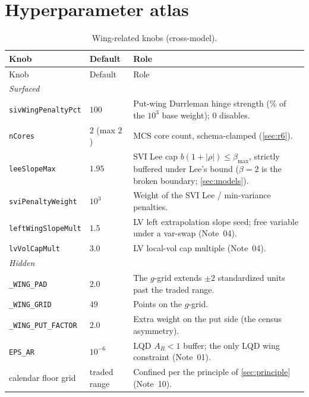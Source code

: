 \documentclass[11pt]{article}
\begin{document}
\appendix
\section{Hyperparameter atlas}
\label{app:atlas}

\begin{longtable}{p{}p{}p{}}
\caption{Wing-related knobs (cross-model).}\label{tab:atlas}\\
\toprule Knob & Default & Role\\ \midrule
\endfirsthead \toprule Knob & Default & Role\\ \midrule \endhead
\multicolumn{3}{l}{\emph{Surfaced}}\\ \midrule
\texttt{sivWingPenaltyPct} & $100$ & Put-wing Durrleman hinge strength
(\% of the $10^3$ base weight); $0$ disables.\\
\texttt{nCores} & $2$ (max $2$) & MCS core count, schema-clamped
(\cref{sec:r6}).\\
\texttt{leeSlopeMax} & $1.95$ & SVI Lee cap $b(1+|\rho|)\le\beta_{\max}$,
strictly buffered under Lee's bound ($\beta=2$ is the broken boundary;
\cref{sec:models}).\\
\texttt{sviPenaltyWeight} & $10^3$ & Weight of the SVI Lee / min-variance
penalties.\\
\texttt{leftWingSlopeMult} & $1.5$ & LV left extrapolation slope seed; free
variable under a var-swap (Note~04).\\
\texttt{lvVolCapMult} & $3.0$ & LV local-vol cap multiple (Note~04).\\
\midrule
\multicolumn{3}{l}{\emph{Hidden}}\\ \midrule
\texttt{\_WING\_PAD} & $2.0$ & The $g$-grid extends $\pm2$ standardized
units past the traded range.\\
\texttt{\_WING\_GRID} & $49$ & Points on the $g$-grid.\\
\texttt{\_WING\_PUT\_FACTOR} & $2.0$ & Extra weight on the put side (the
census asymmetry).\\
\texttt{EPS\_AR} & $10^{-6}$ & LQD $A_R<1$ buffer; the only LQD wing
constraint (Note~01).\\
calendar floor grid & traded range & Confined per the principle of
\cref{sec:principle} (Note~10).\\
\bottomrule
\end{longtable}

\end{document}
